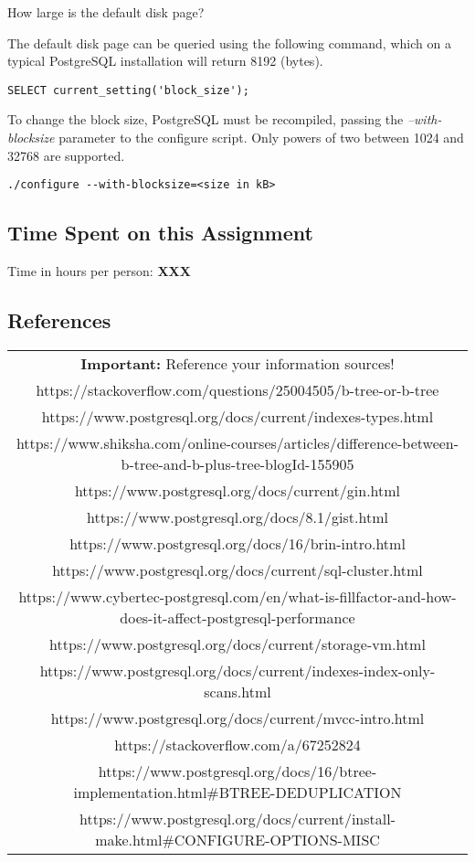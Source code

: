 \documentclass[11pt]{scrartcl}
\begin{document}
How large is the default disk page?

The default disk page can be queried using the following command, which on a typical PostgreSQL installation will return 8192 (bytes).

\begin{lstlisting}[style=dbtsql]
SELECT current_setting('block_size');
\end{lstlisting}

To change the block size, PostgreSQL must be recompiled, passing the \textit{--with-blocksize} parameter to the configure script. Only powers of two between 1024 and 32768 are supported.

\begin{lstlisting}
./configure --with-blocksize=<size in kB>
\end{lstlisting}

\subsection*{Time Spent on this Assignment}

Time in hours per person: \textbf{XXX}

\subsection*{References}

\begin{table}[H]
  \centering
  \begin{tabular}{c}
    \hline
    \textbf{Important:} Reference your information sources! \tabularnewline
    https://stackoverflow.com/questions/25004505/b-tree-or-b-tree \tabularnewline
    https://www.postgresql.org/docs/current/indexes-types.html \tabularnewline
    https://www.shiksha.com/online-courses/articles/difference-between-b-tree-and-b-plus-tree-blogId-155905 \tabularnewline
    https://www.postgresql.org/docs/current/gin.html \tabularnewline
    https://www.postgresql.org/docs/8.1/gist.html \tabularnewline
    https://www.postgresql.org/docs/16/brin-intro.html \tabularnewline
    https://www.postgresql.org/docs/current/sql-cluster.html \tabularnewline
    https://www.cybertec-postgresql.com/en/what-is-fillfactor-and-how-does-it-affect-postgresql-performance \tabularnewline
    https://www.postgresql.org/docs/current/storage-vm.html \tabularnewline
    https://www.postgresql.org/docs/current/indexes-index-only-scans.html \tabularnewline
    https://www.postgresql.org/docs/current/mvcc-intro.html \tabularnewline
    https://stackoverflow.com/a/67252824 \tabularnewline
    https://www.postgresql.org/docs/16/btree-implementation.html\#BTREE-DEDUPLICATION \tabularnewline
    https://www.postgresql.org/docs/current/install-make.html\#CONFIGURE-OPTIONS-MISC\tabularnewline
    \hline
  \end{tabular}
\end{table}
\end{document}
